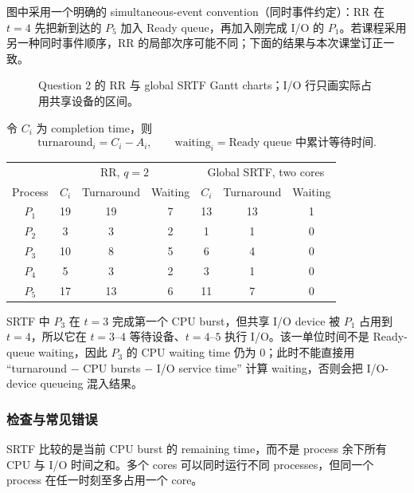 \begin{checkedsolution}
图中采用一个明确的 simultaneous-event convention（同时事件约定）：RR 在 $t=4$ 先把新到达的 $P_5$ 加入 Ready queue，再加入刚完成 I/O 的 $P_1$。若课程采用另一种同时事件顺序，RR 的局部次序可能不同；下面的结果与本次课堂订正一致。

\begin{figure}[htbp]
  \centering
  \resizebox{0.98\textwidth}{!}{}
  \caption{Question 2 的 RR 与 global SRTF Gantt charts；I/O 行只画实际占用共享设备的区间。}
  \label{fig:sc2005-tut03-q2-schedules}
\end{figure}

令 $C_i$ 为 completion time，则
\[
  \text{turnaround}_i=C_i-A_i,
  \qquad
  \text{waiting}_i=\text{Ready queue 中累计等待时间}.
\]

\begin{center}
\small
\begin{tabular}{@{}c|ccc|ccc@{}}
  \toprule
  & \multicolumn{3}{c|}{RR, $q=2$} & \multicolumn{3}{c}{Global SRTF, two cores} \\
  Process & $C_i$ & Turnaround & Waiting & $C_i$ & Turnaround & Waiting \\
  \midrule
  $P_1$ & 19 & 19 & 7 & 13 & 13 & 1 \\
  $P_2$ & 3  & 3  & 2 & 1  & 1  & 0 \\
  $P_3$ & 10 & 8  & 5 & 6  & 4  & 0 \\
  $P_4$ & 5  & 3  & 2 & 3  & 1  & 0 \\
  $P_5$ & 17 & 13 & 6 & 11 & 7  & 0 \\
  \bottomrule
\end{tabular}
\end{center}

SRTF 中 $P_3$ 在 $t=3$ 完成第一个 CPU burst，但共享 I/O device 被 $P_1$ 占用到 $t=4$，所以它在 $t=3$--$4$ 等待设备、$t=4$--$5$ 执行 I/O。该一单位时间不是 Ready-queue waiting，因此 $P_3$ 的 CPU waiting time 仍为 $0$；此时不能直接用 ``turnaround $-$ CPU bursts $-$ I/O service time'' 计算 waiting，否则会把 I/O-device queueing 混入结果。
\end{checkedsolution}

\subsubsection*{检查与常见错误}

SRTF 比较的是当前 CPU burst 的 remaining time，而不是 process 余下所有 CPU 与 I/O 时间之和。多个 cores 可以同时运行不同 processes，但同一个 process 在任一时刻至多占用一个 core。

